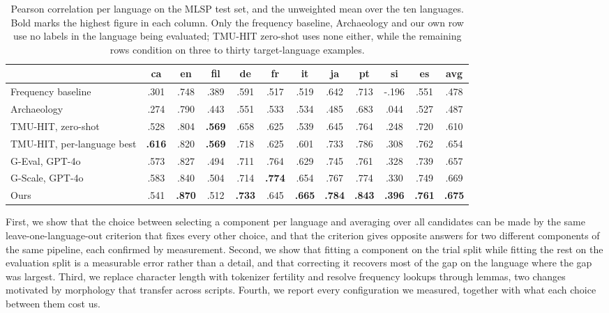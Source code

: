 \begin{table}[t]
\centering
\small
\begin{tabular}{lccccccccccc}
\toprule
& ca & en & fil & de & fr & it & ja & pt & si & es & avg \\
\midrule
Frequency baseline      & .301 & .748 & .389 & .591 & .517 & .519 & .642 & .713 & -.196 & .551 & .478 \\
Archaeology             & .274 & .790 & .443 & .551 & .533 & .534 & .485 & .683 & .044 & .527 & .487 \\
TMU-HIT, zero-shot      & .528 & .804 & \textbf{.569} & .658 & .625 & .539 & .645 & .764 & .248 & .720 & .610 \\
TMU-HIT, per-language best & \textbf{.616} & .820 & \textbf{.569} & .718 & .625 & .601 & .733 & .786 & .308 & .762 & .654 \\
G-Eval, GPT-4o          & .573 & .827 & .494 & .711 & .764 & .629 & .745 & .761 & .328 & .739 & .657 \\
G-Scale, GPT-4o         & .583 & .840 & .504 & .714 & \textbf{.774} & .654 & .767 & .774 & .330 & .749 & .669 \\
\midrule
Ours                    & .541 & \textbf{.870} & .512 & \textbf{.733} & .645 & \textbf{.665} & \textbf{.784} & \textbf{.843} & \textbf{.396} & \textbf{.761} & \textbf{.675} \\
\bottomrule
\end{tabular}
\caption{Pearson correlation per language on the MLSP test set, and the
unweighted mean over the ten languages. Bold marks the highest figure
in each column. Only the frequency baseline, Archaeology and our own
row use no labels in the language being evaluated; TMU-HIT zero-shot
uses none either, while the remaining rows condition on three to thirty
target-language examples.}
\label{tab:results}
\end{table}



First, we show that the choice between selecting a component per
language and averaging over all candidates can be made by the same
leave-one-language-out criterion that fixes every other choice, and
that the criterion gives opposite answers for two different components
of the same pipeline, each confirmed by measurement. Second, we show
that fitting a component on the trial split while fitting the rest on
the evaluation split is a measurable error rather than a detail, and
that correcting it recovers most of the gap on the language where the
gap was largest. Third, we replace character length with tokenizer
fertility and resolve frequency lookups through lemmas, two changes
motivated by morphology that transfer across scripts. Fourth, we report
every configuration we measured, together with what each choice
between them cost us.
